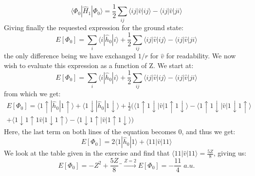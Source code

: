 \documentclass{article}
\begin{document}
\begin{equation*}
    \langle \Phi_0 | \hat H_1 | \Phi_0 \rangle = \frac{1}{2} \sum_{ij} \langle ij | \hat v | ij \rangle - \langle ij | \hat v | ji \rangle
\end{equation*}
Giving finally the requested expression for the ground state:
\begin{equation}
    E\left[\Phi_0 \right] = \sum_i \langle i | \hat h_0 | i \rangle + \frac{1}{2} \sum_{ij} \langle ij | \hat v | ij \rangle - \langle ij | \hat v | ji \rangle
\end{equation}
the only difference being we have exchanged $1/r$ for $\hat v$ for readability.
\newline
We now wish to evaluate this expression as a function of Z. 
\newline
We start at:
\begin{equation*}
    E\left[\Phi_0 \right] = \sum_i \langle i | \hat h_0 | i \rangle + \frac{1}{2} \sum_{ij} \langle ij | \hat v | ij \rangle - \langle ij | \hat v | ji \rangle
\end{equation*}
from which we get:
\begin{gather*}
    E\left[\Phi_0 \right] = \langle 1 \uparrow | \hat h_0 | 1 \uparrow \rangle + \langle 1 \downarrow | \hat h_0 | 1 \downarrow \rangle + \frac{1}{2}( \langle 1 \uparrow 1 \downarrow | \hat v | 1 \uparrow 1 \downarrow \rangle - \langle 1 \uparrow 1 \downarrow | \hat v | 1 \downarrow 1 \uparrow \rangle  \\ + \langle 1 \downarrow 1 \uparrow 1 \hat v | 1 \downarrow 1 \uparrow \rangle - \langle 1 \downarrow 1 \uparrow | \hat v | 1 \uparrow 1 \downarrow \rangle )
\end{gather*}
Here, the last term on both lines of the equation becomes 0, and thus we get:
\begin{equation}
    E\left[\Phi_0 \right] = 2 \langle 1 | \hat h_0 | 1 \rangle + \langle 11 | \hat v | 11 \rangle
\end{equation}
We look at the table given in the exercise and find that $\langle 11 | \hat v | 11 \rangle = \frac{5Z}{8}$, giving us:
\begin{equation}
    E\left[\Phi_0 \right] = - {Z^2} + \frac{5Z}{8}¨\xrightarrow[]{Z = 2} E\left[\Phi_0 \right] = - \frac{11}{4} \; a.u.
\end{equation}
\end{document}
